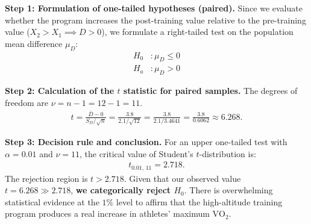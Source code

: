 \begin{solucion}
	\textbf{Step 1: Formulation of one-tailed hypotheses (paired).}
	Since we evaluate whether the program increases the post-training value relative to the pre-training value ($X_2 > X_1 \implies D > 0$), we formulate a right-tailed test on the population mean difference $\mu_D$:
	\begin{align}
		H_0&: \mu_D \leq 0 \\
		H_a&: \mu_D > 0
	\end{align}
	
	\textbf{Step 2: Calculation of the $t$ statistic for paired samples.}
	The degrees of freedom are $\nu = n - 1 = 12 - 1 = 11$.
	\begin{align}
		t = \frac{\bar{D} - 0}{S_D / \sqrt{n}} = \frac{3.8}{2.1 / \sqrt{12}} = \frac{3.8}{2.1 / 3.4641} = \frac{3.8}{0.6062} \approx 6.268.
	\end{align}
	
	\textbf{Step 3: Decision rule and conclusion.}
	For an upper one-tailed test with $\alpha = 0.01$ and $\nu = 11$, the critical value of Student's $t$-distribution is:
	\begin{align}
		t_{0.01, \, 11} = 2.718.
	\end{align}
	The rejection region is $t > 2.718$. Given that our observed value $t = 6.268 \gg 2.718$, \textbf{we categorically reject $H_0$}. There is overwhelming statistical evidence at the $1\%$ level to affirm that the high-altitude training program produces a real increase in athletes' maximum $\text{VO}_2$.
\end{solucion}

